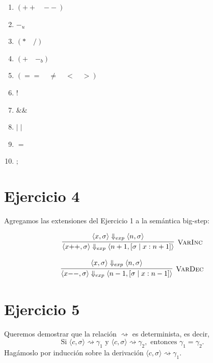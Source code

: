 \documentclass[12pt, a4paper]{article}
\begin{document}
\begin{center}
\begin{minipage}{0.3\textwidth}
\begin{enumerate}
\setlength\itemsep{0pt}
\setlength\parskip{0pt}
    \item $(\mathbf{++} \quad \mathbf{--})$
    \item $-_u$
    \item $(* \quad /)$
    \item $(+ \quad -_b)$
    \item $(== \quad \neq \quad < \quad >)$
    \item $!$
    \item $\&\&$
    \item $\mid \mid$
    \item $=$
    \item $;$
\end{enumerate}
\end{minipage}
\end{center}


\section*{Ejercicio 4}

Agregamos las extensiones del Ejercicio 1 a la semántica big-step:

\[
\infer[\textsc{VarInc}]
  {\langle x{+}{+}, \sigma\rangle \Downarrow_{exp} \langle n+1, [\sigma \mid x : n+1]\rangle}
  {\langle x, \sigma\rangle \Downarrow_{exp} \langle n, \sigma\rangle}
\]

\[
\infer[\textsc{VarDec}]
  {\langle x{-}{-}, \sigma\rangle \Downarrow_{exp} \langle n-1, [\sigma \mid x : n-1]\rangle}
  {\langle x, \sigma\rangle \Downarrow_{exp} \langle n, \sigma\rangle}
\]


\section*{Ejercicio 5}

Queremos demostrar que la relación $\rightsquigarrow$ es determinista, es decir,
\[
\text{Si } \langle c,\sigma\rangle \rightsquigarrow \gamma_1
\text{ y } \langle c,\sigma\rangle \rightsquigarrow \gamma_2,
\text{ entonces } \gamma_1=\gamma_2.
\]
Hagámoslo por inducción sobre la derivación
$\langle c,\sigma\rangle \rightsquigarrow \gamma_1$.
\end{document}
